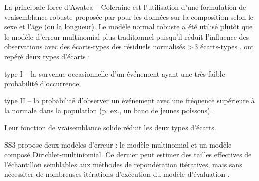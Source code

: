 \documentclass[11pt]{book}
\begin{document}
La principale force d'Awatea -- Coleraine est l'utilisation d'une formulation de vraisemblance robuste propos\'{e}e par \citet{Fournier-etal:1998} pour les donn\'{e}es sur la composition selon le sexe et l'\^{a}ge (ou la longueur).
Le mod\`{e}le normal robuste a \'{e}t\'{e} utilis\'{e} plut\^{o}t que le mod\`{e}le d'erreur multinomial plus traditionnel puisqu'il r\'{e}duit l'influence des observations avec des \'{e}carts-types des r\'{e}siduels normalis\'{e}s >\,3 \'{e}carts-types \citep{Fournier-etal:1990}.
\citet{Fournier-etal:1990} ont rep\'{e}r\'{e} deux types d'\'{e}carts :
\begin{itemize_csas}{}{}
	\item type I -- la survenue occasionnelle d'un \'{e}v\'{e}nement ayant une tr\`{e}s faible probabilit\'{e} d'occurrence;
	\item type II -- la probabilit\'{e} d'observer un \'{e}v\'{e}nement avec une fr\'{e}quence sup\'{e}rieure \`{a} la normale dans la population (p. ex., un banc de jeunes poissons).
\end{itemize_csas}
Leur fonction de vraisemblance solide r\'{e}duit les deux types d'\'{e}carts.

SS3 propose deux mod\`{e}les d'erreur : le mod\`{e}le multinomial et un mod\`{e}le compos\'{e} Dirichlet-multiniomial. Ce dernier peut estimer des tailles effectives de l'\'{e}chantillon semblables aux m\'{e}thodes de repond\'{e}ration it\'{e}ratives, mais sans n\'{e}cessiter de nombreuses it\'{e}rations d'ex\'{e}cution du mod\`{e}le d'\'{e}valuation \citep{Thorson-etal:2017}.
\end{document}
